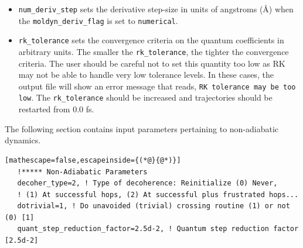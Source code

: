 \documentclass[letterpaper,12pt,titlepage]{article}
\begin{document}
\begin{itemize}
\item \verb+num_deriv_step+ sets the derivative step-size in units of angstroms (\AA) when the \verb+moldyn_deriv_flag+ is set to \verb+numerical+.
\item \verb+rk_tolerance+ sets the convergence criteria on the quantum coefficients in arbitrary units.  The smaller the \verb+rk_tolerance+, the tighter the convergence criteria.  The user should be careful not to set this quantity too low as RK may not be able to handle very low tolerance levels.  In these cases, the output file will show an error message that reads, \verb+RK tolerance may be too low+.  The \verb+rk_tolerance+ should be increased and trajectories should be restarted from 0.0 fs.
\end{itemize}

The following section contains input parameters pertaining to non-adiabatic dynamics.
\begin{lstlisting}[mathescape=false,escapeinside={(*@}{@*)}]
   !***** Non-Adiabatic Parameters
   decoher_type=2, ! Type of decoherence: Reinitialize (0) Never, 
   ! (1) At successful hops, (2) At successful plus frustrated hops... 
   dotrivial=1, ! Do unavoided (trivial) crossing routine (1) or not (0) [1]
   quant_step_reduction_factor=2.5d-2, ! Quantum step reduction factor [2.5d-2]
\end{lstlisting}
\end{document}
